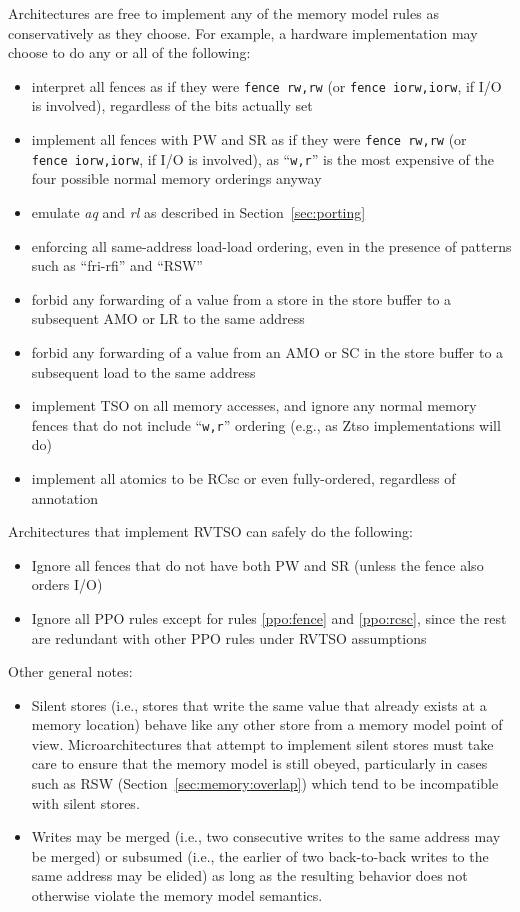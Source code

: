 Architectures are free to implement any of the memory model rules as conservatively as they choose.  For example, a hardware implementation may choose to do any or all of the following:
  \begin{itemize}
    \item interpret all fences as if they were {\tt fence rw,rw} (or {\tt fence iorw,iorw}, if I/O is involved), regardless of the bits actually set
    \item implement all fences with PW and SR as if they were {\tt fence~rw,rw} (or {\tt fence~iorw,iorw}, if I/O is involved), as ``{\tt w,r}'' is the most expensive of the four possible normal memory orderings anyway
    \item emulate {\em aq} and {\em rl} as described in Section~\ref{sec:porting}
    \item enforcing all same-address load-load ordering, even in the presence of patterns such as ``fri-rfi'' and ``RSW''
    \item forbid any forwarding of a value from a store in the store buffer to a subsequent AMO or LR to the same address
    \item forbid any forwarding of a value from an AMO or SC in the store buffer to a subsequent load to the same address
    \item implement TSO on all memory accesses, and ignore any normal memory fences that do not include ``{\tt w,r}'' ordering (e.g., as Ztso implementations will do)
    \item implement all atomics to be RCsc or even fully-ordered, regardless of annotation
  \end{itemize}

Architectures that implement RVTSO can safely do the following:
\begin{itemize}
  \item Ignore all fences that do not have both PW and SR (unless the fence also orders I/O)
  \item Ignore all PPO rules except for rules \ref{ppo:fence} and \ref{ppo:rcsc}, since the rest are redundant with other PPO rules under RVTSO assumptions
\end{itemize}

Other general notes:

\begin{itemize}
  \item Silent stores (i.e., stores that write the same value that already exists at a memory location) behave like any other store from a memory model point of view.  Microarchitectures that attempt to implement silent stores must take care to ensure that the memory model is still obeyed, particularly in cases such as RSW (Section~\ref{sec:memory:overlap}) which tend to be incompatible with silent stores.
  \item Writes may be merged (i.e., two consecutive writes to the same address may be merged) or subsumed (i.e., the earlier of two back-to-back writes to the same address may be elided) as long as the resulting behavior does not otherwise violate the memory model semantics.
\end{itemize}

